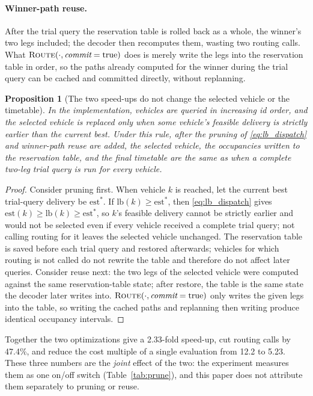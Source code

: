 \documentclass[manuscript,screen,review]{acmart}
\newtheorem{prop}{Proposition}
\newcommand{\SpeedupProbe}{2.33}
\newcommand{\RouteCallCut}{47.4\%}
\newcommand{\CostMultBefore}{12.2}
\newcommand{\CostMultAfter}{5.23}
\begin{document}
\paragraph{Winner-path reuse.}
After the trial query the reservation table is rolled back as a whole, the winner's two legs included; the decoder then recomputes them, wasting two routing calls.
What $\textsc{Route}(\cdot,\textit{commit}=\text{true})$ does is merely write the legs into the reservation table in order, so the paths already computed for the winner during the trial query can be cached and committed directly, without replanning.

\begin{prop}[The two speed-ups do not change the selected vehicle or the timetable]
  \label{prop:speedup_equiv}
  In the implementation, vehicles are queried in increasing id order, and the selected vehicle is replaced only when some vehicle's feasible delivery is strictly earlier than the current best.
  Under this rule, after the pruning of \eqref{eq:lb_dispatch} and winner-path reuse are added, the selected vehicle, the occupancies written to the reservation table, and the final timetable are the same as when a complete two-leg trial query is run for every vehicle.
\end{prop}

\begin{proof}
  Consider pruning first.
  When vehicle $k$ is reached, let the current best trial-query delivery be $\mathrm{est}^{\ast}$.
  If $\mathrm{lb}(k)\ge \mathrm{est}^{\ast}$, then \eqref{eq:lb_dispatch} gives
  $\mathrm{est}(k)\ge\mathrm{lb}(k)\ge\mathrm{est}^{\ast}$,
  so $k$'s feasible delivery cannot be strictly earlier and would not be selected even if every vehicle received a complete trial query; not calling routing for it leaves the selected vehicle unchanged.
  The reservation table is saved before each trial query and restored afterwards; vehicles for which routing is not called do not rewrite the table and therefore do not affect later queries.
  Consider reuse next: the two legs of the selected vehicle were computed against the same reservation-table state; after restore, the table is the same state the decoder later writes into.
  $\textsc{Route}(\cdot,\textit{commit}=\text{true})$ only writes the given legs into the table, so writing the cached paths and replanning then writing produce identical occupancy intervals.
\end{proof}

Together the two optimizations give a \SpeedupProbe{}-fold speed-up, cut routing calls by \RouteCallCut{}, and reduce the cost multiple of a single evaluation from \CostMultBefore{} to \CostMultAfter{}.
These three numbers are the \emph{joint} effect of the two: the experiment measures them as one on/off switch (Table~\ref{tab:prune}), and this paper does not attribute them separately to pruning or reuse.
\end{document}
